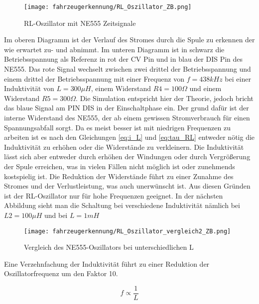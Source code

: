 \begin{figure}[H]
    \centering
    \texttt{[image: fahrzeugerkennung/RL\_Oszillator\_ZB.png]}
    \caption{RL-Oszillator mit NE555 Zeitsignale}
\end{figure}

Im oberen Diagramm ist der Verlauf des Stromes durch die Spule zu erkennen der wie erwartet zu- und abnimmt. Im unteren Diagramm ist in 
schwarz die Betriebsspannung als Referenz in rot der CV Pin und in blau der DIS Pin des NE555. Das rote Signal wechselt zwischen zwei drittel der Betriebsspannung 
und einem drittel der Betriebsspannung mit einer Frequenz von $f = 438kHz$ bei einer Induktivität von $L = 300 \mu H$, einem Widerstand $R4 = 100\Omega$ und einem
Widerstand $R5 = 300\Omega$. Die Simulation entspricht hier der Theorie, jedoch bricht das blaue Signal am PIN DIS in der Einschaltphase ein.
Der grund dafür ist der interne Widerstand des NE555, der ab einem gewissen Stromverbrauch für einen Spannungsabfall sorgt. Da es meist besser ist mit
niedrigen Frequenzen zu arbeiten ist es nach den Gleichungen \ref{eq:i_L} und \ref{eq:tau_RL} entweder nötig die Induktivität zu erhöhen oder die Widerstände zu verkleinern.
Die Induktivität lässt sich aber entweder durch erhöhen der Windungen oder durch Vergrößerung der Spule erreichen, was in vielen Fällen nicht möglich ist oder zunehmends kostspielig ist.
Die Reduktion der Widerstände führt zu einer Zunahme des Stromes und der Verlustleistung, was auch unerwünscht ist.
Aus diesen Gründen ist der RL-Oszillator nur für hohe Frequenzen geeignet. In der nächsten Abbildung sieht man die Schaltung bei verschiedene Induktivität
nämlich bei $L2 = 100 \mu H$ und bei $L = 1mH$

\begin{figure}[H]
    \centering
    \texttt{[image: fahrzeugerkennung/RL\_Oszillator\_vergleich2\_ZB.png]}
    \caption{Vergleich des NE555-Oszillators bei unterschiedlichen L}
\end{figure}

Eine Verzehnfachung der Induktivität führt zu einer Reduktion der Oszillatorfrequenz um den Faktor 10.

\begin{equation} \label{iq:f_NE555}
    f \propto \frac{1}{L}
\end{equation} 

\pagebreak
